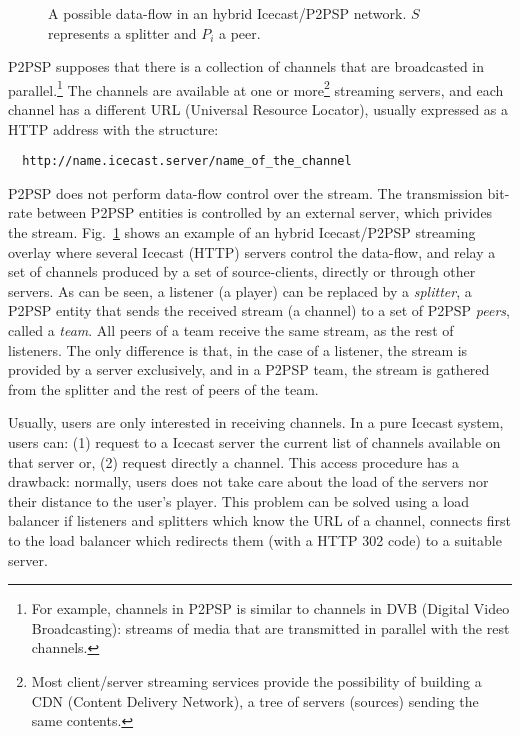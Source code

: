 \label{sec:TTS}

\begin{figure}
   \caption{A possible data-flow in an
  hybrid Icecast/P2PSP network. $S$ represents a splitter and $P_i$ a
  peer.\label{fig:icecast-P2PSP}}
\end{figure}

P2PSP supposes that there is a collection of channels that are
broadcasted in parallel.\footnote{For example, channels in P2PSP is
  similar to channels in DVB (Digital Video Broadcasting): streams of
  media that are transmitted in parallel with the rest channels.} The
channels are available at one or more\footnote{Most client/server
  streaming services provide the possibility of building a CDN
  (Content Delivery Network), a tree of servers (sources) sending the
  same contents.} streaming servers, and each channel has a different
URL (Universal Resource Locator), usually expressed as a HTTP
address with the structure:
\begin{verbatim}
  http://name.icecast.server/name_of_the_channel
\end{verbatim}

P2PSP does not perform data-flow control over the stream. The
transmission bit-rate between P2PSP entities is controlled by an
external server, which privides the
stream. Fig.~\ref{fig:icecast-P2PSP} shows an example of an hybrid
Icecast/P2PSP streaming overlay where several Icecast (HTTP) servers
control the data-flow, and relay a set of channels produced by a set
of source-clients, directly or through other servers. As can be seen,
a listener (a player) can be replaced by a \emph{splitter}, a P2PSP
entity that sends the received stream (a channel) to a set of P2PSP
\emph{peers}, called a \emph{team}. All peers of a team receive the
same stream, as the rest of listeners. The only difference is that, in
the case of a listener, the stream is provided by a server
exclusively, and in a P2PSP team, the stream is gathered from the
splitter and the rest of peers of the team.

Usually, users are only interested in receiving channels. In a pure
Icecast system, users can: (1) request to a Icecast server the current
list of channels available on that server or, (2) request directly a
channel. This access procedure has a drawback: normally, users does
not take care about the load of the servers nor their distance to the
user's player. This problem can be solved using a load balancer if
listeners and splitters which know the URL of a channel, connects
first to the load balancer which redirects them (with a HTTP 302 code)
to a suitable server.

